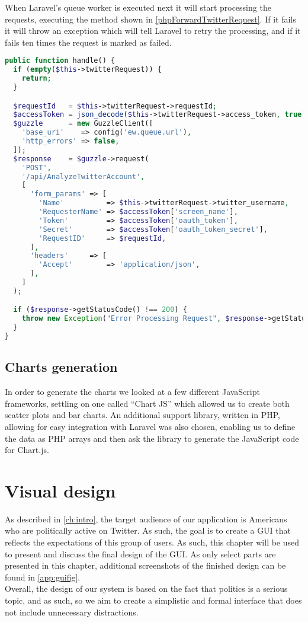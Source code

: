 When Laravel's queue worker is executed next it will start processing the
requests, executing the  method shown in
\autoref{phpForwardTwitterRequest}. If it fails it will throw an exception which
will tell Laravel to retry the processing, and if it fails ten times the request
is marked as failed.\nl

\begin{minipage}[H]{\linewidth}
\begin{lstlisting}[caption = Handle method of the ForwardTwitterRequest class,
label = phpForwardTwitterRequest, language = PHP, style = PHP]
public function handle() {
  if (empty($this->twitterRequest)) {
    return;
  }

  $requestId   = $this->twitterRequest->requestId;
  $accessToken = json_decode($this->twitterRequest->access_token, true);
  $guzzle      = new GuzzleClient([
    'base_uri'    => config('ew.queue.url'),
    'http_errors' => false,
  ]);
  $response    = $guzzle->request(
    'POST',
    '/api/AnalyzeTwitterAccount',
    [
      'form_params' => [
        'Name'          => $this->twitterRequest->twitter_username,
        'RequesterName' => $accessToken['screen_name'],
        'Token'         => $accessToken['oauth_token'],
        'Secret'        => $accessToken['oauth_token_secret'],
        'RequestID'     => $requestId,
      ],
      'headers'     => [
        'Accept'        => 'application/json',
      ],
    ]
  );

  if ($response->getStatusCode() !== 200) {
    throw new Exception("Error Processing Request", $response->getStatusCode());
  }
}
\end{lstlisting}
\end{minipage}

\subsection{Charts generation}
In order to generate the charts we looked at a few different JavaScript
frameworks, settling on one called ``Chart JS'' which allowed us to create
both scatter plots and bar charts. An additional support library, written in
PHP, allowing for easy integration with Laravel was also chosen, enabling us to
define the data as PHP arrays and then ask the library to generate the
JavaScript code for Chart.js.

\section{Visual design} \label{sec:gui-visual-design}
As described in \autoref{ch:intro}, the target audience of our application is
Americans who are politically active on Twitter. As such, the goal is to create
a GUI that reflects the expectations of this group of users. As such, this
chapter will be used to present and discuss the final design of the GUI. As only
select parts are presented in this chapter, additional screenshots of the
finished design can be found in \autoref{app:guifig}. \\
Overall, the design of our system is based on the fact that politics is a
serious topic, and as such, so we aim to create a simplistic and formal
interface that does not include unnecessary distractions.

